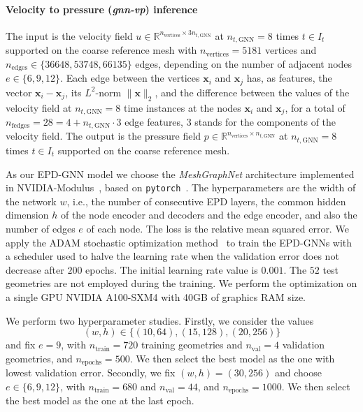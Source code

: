 \paragraph*{Velocity to pressure (\textit{gnn-vp}) inference}
The input is the velocity field $u\in\mathbb{R}^{n_{\text{vertices}}\times 3n_{t,\text{GNN}}}$ at $n_{t,\text{GNN}}=8$ times $t\in I_t$ supported on the coarse reference mesh with $n_{\text{vertices}}=5181$ vertices and $n_{\text{edges}}\in\{36648, 53748, 66135\}$ edges, depending on the number of adjacent nodes $e\in\{6, 9, 12\}$. Each edge between the vertices $\mathbf{x}_i$ and $\mathbf{x}_j$ has, as features, the vector $\mathbf{x}_i-\mathbf{x}_j$, its $L^2$-norm $\lVert\mathbf{x}\rVert_2$, and the difference between the values of the velocity field at $n_{t,\text{GNN}}=8$ time instances at the nodes $\mathbf{x}_i$ and $\mathbf{x}_j$, for a total of $n_{\text{fedges}}=28=4+n_{t,\text{GNN}}\cdot 3$ edge features, $3$ stands for the components of the velocity field. The output is the pressure field $p\in\mathbb{R}^{n_{\text{vertices}}\times n_{t,\text{GNN}}}$ at $n_{t,\text{GNN}}=8$ times $t\in I_t$ supported on the coarse reference mesh. \newline

As our EPD-GNN model we choose the \textit{MeshGraphNet} architecture implemented in NVIDIA-Modulus~\cite{modulus}, based on \texttt{pytorch}~\cite{NEURIPS2019_9015}. The hyperparameters are the width of the network $w$, i.e., the number of consecutive EPD layers, the common hidden dimension $h$ of the node encoder and decoders and the edge encoder, and also the number of edges $e$ of each node. The loss is the relative mean squared error. We apply the ADAM stochastic optimization method~\cite{kingma2014adam} to train the EPD-GNNs with a scheduler used to halve the learning rate when the validation error does not decrease after $200$ epochs. The initial learning rate value is $0.001$. The $52$ test geometries are not employed during the training. We perform the optimization on a single GPU NVIDIA A100-SXM4 with 40GB of graphics RAM size.

We perform two hyperparameter studies.  Firstly, we consider the values $$(w,h)\in\{(10, 64), (15, 128), (20, 256)\}$$ and fix $e=9$, with $n_{\text{train}}=720$ training geometries and $n_{\text{val}}=4$ validation geometries, and $n_{\text{epochs}}=500$. We then select the best model as the one with lowest validation error. 
Secondly, we fix $(w,h)=(30, 256)$ and choose $e\in\{6, 9, 12\}$, with $n_{\text{train}}=680$ and $n_{\text{val}}=44$, and $n_{\text{epochs}}=1000$. We then select the best model as the one at the last epoch.

